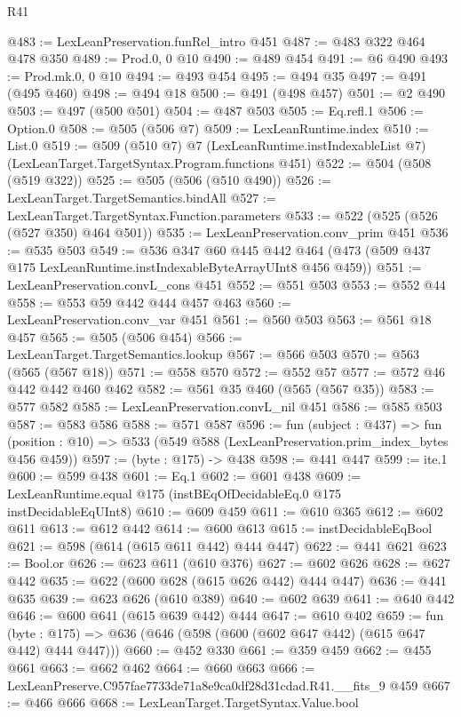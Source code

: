 \begin{lexlean}{R41}
\begin{coremodule}
@483 := LexLeanPreservation.funRel_intro @451
@487 := @483 @322 @464 @478 @350
@489 := Prod.{0, 0} @10
@490 := @489 @454
@491 := @6 @490
@493 := Prod.mk.{0, 0} @10
@494 := @493 @454
@495 := @494 @35
@497 := @491 (@495 @460)
@498 := @494 @18
@500 := @491 (@498 @457)
@501 := @2 @490
@503 := @497 (@500 @501)
@504 := @487 @503
@505 := Eq.refl.{1}
@506 := Option.{0}
@508 := @505 (@506 @7)
@509 := LexLeanRuntime.index
@510 := List.{0}
@519 := @509
    (@510 @7)
    @7
    (LexLeanRuntime.instIndexableList @7)
    (LexLeanTarget.TargetSyntax.Program.functions @451)
@522 := @504 (@508 (@519 @322))
@525 := @505 (@506 (@510 @490))
@526 := LexLeanTarget.TargetSemantics.bindAll
@527 := LexLeanTarget.TargetSyntax.Function.parameters
@533 := @522 (@525 (@526 (@527 @350) @464 @501))
@535 := LexLeanPreservation.conv_prim @451
@536 := @535 @503
@549 := @536
    @347
    @60
    @445
    @442
    @464
    (@473 (@509 @437 @175 LexLeanRuntime.instIndexableByteArrayUInt8 @456 @459))
@551 := LexLeanPreservation.convL_cons @451
@552 := @551 @503
@553 := @552 @44
@558 := @553 @59 @442 @444 @457 @463
@560 := LexLeanPreservation.conv_var @451
@561 := @560 @503
@563 := @561 @18 @457
@565 := @505 (@506 @454)
@566 := LexLeanTarget.TargetSemantics.lookup
@567 := @566 @503
@570 := @563 (@565 (@567 @18))
@571 := @558 @570
@572 := @552 @57
@577 := @572 @46 @442 @442 @460 @462
@582 := @561 @35 @460 (@565 (@567 @35))
@583 := @577 @582
@585 := LexLeanPreservation.convL_nil @451
@586 := @585 @503
@587 := @583 @586
@588 := @571 @587
@596 := fun (subject : @437) =>
  fun (position : @10) => @533 (@549 @588 (LexLeanPreservation.prim_index_bytes @456 @459))
@597 := (byte : @175) -> @438
@598 := @441 @447
@599 := ite.{1}
@600 := @599 @438
@601 := Eq.{1}
@602 := @601 @438
@609 := LexLeanRuntime.equal @175 (instBEqOfDecidableEq.{0} @175 instDecidableEqUInt8)
@610 := @609 @459
@611 := @610 @365
@612 := @602 @611
@613 := @612 @442
@614 := @600 @613
@615 := instDecidableEqBool
@621 := @598 (@614 (@615 @611 @442) @444 @447)
@622 := @441 @621
@623 := Bool.or
@626 := @623 @611 (@610 @376)
@627 := @602 @626
@628 := @627 @442
@635 := @622 (@600 @628 (@615 @626 @442) @444 @447)
@636 := @441 @635
@639 := @623 @626 (@610 @389)
@640 := @602 @639
@641 := @640 @442
@646 := @600 @641 (@615 @639 @442) @444
@647 := @610 @402
@659 := fun (byte : @175) => @636 (@646 (@598 (@600 (@602 @647 @442) (@615 @647 @442) @444 @447)))
@660 := @452 @330
@661 := @359 @459
@662 := @455 @661
@663 := @662 @462
@664 := @660 @663
@666 := LexLeanPreserve.C957fae7733de71a8e9ca0df28d31cdad.R41.__fits_9 @459
@667 := @466 @666
@668 := LexLeanTarget.TargetSyntax.Value.bool

\end{coremodule}
\end{lexlean}
